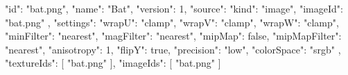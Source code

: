 {
  "id": "bat.png",
  "name": "Bat",
  "version": 1,
  "source": {
    "kind": "image",
    "imageId": "bat.png"
  },
  "settings": {
    "wrapU": "clamp",
    "wrapV": "clamp",
    "wrapW": "clamp",
    "minFilter": "nearest",
    "magFilter": "nearest",
    "mipMap": false,
    "mipMapFilter": "nearest",
    "anisotropy": 1,
    "flipY": true,
    "precision": "low",
    "colorSpace": "srgb"
  },
  "textureIds": [
    "bat.png"
  ],
  "imageIds": [
    "bat.png"
  ]
}
